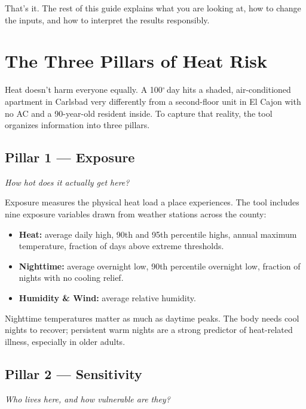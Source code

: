 \documentclass[11pt]{article}
\newcommand{\degree}{$^\circ$}
\begin{document}
That's it. The rest of this guide explains what you are looking at, how to
change the inputs, and how to interpret the results responsibly.

\section{The Three Pillars of Heat Risk}
\label{sec:pillars}

Heat doesn't harm everyone equally. A 100\degree\,day hits a shaded,
air-conditioned apartment in Carlsbad very differently from a second-floor
unit in El Cajon with no AC and a 90-year-old resident inside. To capture
that reality, the tool organizes information into three pillars.

\subsection*{\textcolor{exposure}{Pillar 1 --- Exposure}}
\textit{How hot does it actually get here?}

Exposure measures the physical heat load a place experiences. The tool
includes nine exposure variables drawn from weather stations across the
county:

\begin{itemize}[leftmargin=*]
  \item \textbf{Heat:} average daily high, 90th and 95th percentile highs,
        annual maximum temperature, fraction of days above extreme thresholds.
  \item \textbf{Nighttime:} average overnight low, 90th percentile overnight
        low, fraction of nights with no cooling relief.
  \item \textbf{Humidity \& Wind:} average relative humidity.
\end{itemize}

\begin{tipbox}
Nighttime temperatures matter as much as daytime peaks. The body needs
cool nights to recover; persistent warm nights are a strong predictor of
heat-related illness, especially in older adults.
\end{tipbox}

\subsection*{\textcolor{sensitivity}{Pillar 2 --- Sensitivity}}
\textit{Who lives here, and how vulnerable are they?}
\end{document}
